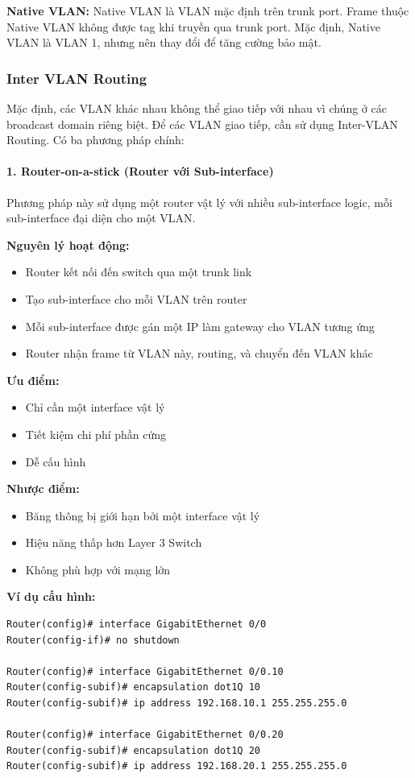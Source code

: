 \textbf{Native VLAN:}
Native VLAN là VLAN mặc định trên trunk port. Frame thuộc Native VLAN không được tag khi truyền qua trunk port. Mặc định, Native VLAN là VLAN 1, nhưng nên thay đổi để tăng cường bảo mật.

\subsubsection{Inter VLAN Routing}
Mặc định, các VLAN khác nhau không thể giao tiếp với nhau vì chúng ở các broadcast domain riêng biệt. Để các VLAN giao tiếp, cần sử dụng Inter-VLAN Routing. Có ba phương pháp chính:

\paragraph{1. Router-on-a-stick (Router với Sub-interface)}
Phương pháp này sử dụng một router vật lý với nhiều sub-interface logic, mỗi sub-interface đại diện cho một VLAN.

\textbf{Nguyên lý hoạt động:}
\begin{itemize}
    \item Router kết nối đến switch qua một trunk link
    \item Tạo sub-interface cho mỗi VLAN trên router
    \item Mỗi sub-interface được gán một IP làm gateway cho VLAN tương ứng
    \item Router nhận frame từ VLAN này, routing, và chuyển đến VLAN khác
\end{itemize}

\textbf{Ưu điểm:}
\begin{itemize}
    \item Chỉ cần một interface vật lý
    \item Tiết kiệm chi phí phần cứng
    \item Dễ cấu hình
\end{itemize}

\textbf{Nhược điểm:}
\begin{itemize}
    \item Băng thông bị giới hạn bởi một interface vật lý
    \item Hiệu năng thấp hơn Layer 3 Switch
    \item Không phù hợp với mạng lớn
\end{itemize}

\textbf{Ví dụ cấu hình:}
\begin{verbatim}
Router(config)# interface GigabitEthernet 0/0
Router(config-if)# no shutdown

Router(config)# interface GigabitEthernet 0/0.10
Router(config-subif)# encapsulation dot1Q 10
Router(config-subif)# ip address 192.168.10.1 255.255.255.0

Router(config)# interface GigabitEthernet 0/0.20
Router(config-subif)# encapsulation dot1Q 20
Router(config-subif)# ip address 192.168.20.1 255.255.255.0
\end{verbatim}

